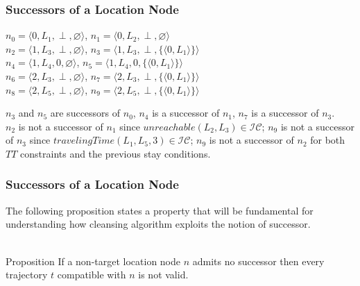 \begin{frame}
\frametitle{Successors of a Location Node}

\begin{center}
  $n_0 = \langle 0, L_1, \perp, \varnothing \rangle$, $n_1 = \langle 0, L_2, \perp, \varnothing \rangle$ \\
  $n_2 = \langle 1, L_3, \perp, \varnothing \rangle$, $n_3 = \langle 1, L_3, \perp, \{ \langle 0, L_1 \rangle \} \rangle$ \\
  $n_4 = \langle 1, L_4, 0, \varnothing \rangle$, $n_5 = \langle 1, L_4, 0, \{ \langle 0, L_1 \rangle \} \rangle$ \\
  $n_6 = \langle 2, L_3, \perp, \varnothing \rangle$, $n_7 = \langle 2, L_3, \perp, \{ \langle 0, L_1 \rangle \} \rangle$ \\
  $n_8 = \langle 2, L_5, \perp, \varnothing \rangle$, $n_9 = \langle 2, L_5, \perp, \{ \langle 0, L_1 \rangle \} \rangle$
\end{center}

\begin{example}
  $n_3$ and $n_5$ are successors of $n_0$, $n_4$ is a successor of $n_1$, $n_7$ is a successor of $n_3$.\\
  $n_2$ is not a successor of $n_1$ since $unreachable(L_2,L_3) \in \mathcal{IC}$; $n_9$ is not a successor of $n_3$ since $travelingTime(L_1, L_5, 3) \in \mathcal{IC}$; $n_9$ is not a successor of $n_2$ for both $TT$ constraints and the previous stay conditions.
\end{example}


\end{frame}


\begin{frame}
\frametitle{Successors of a Location Node}

\textrm{The following proposition states a property that will be fundamental for understanding how cleansing algorithm exploits the notion of successor.}\\~\\

\begin{block}{Proposition}
  If a non-target location node $n$ admits no successor then every trajectory $t$ compatible with $n$ is not valid.
\end{block}

\end{frame}


